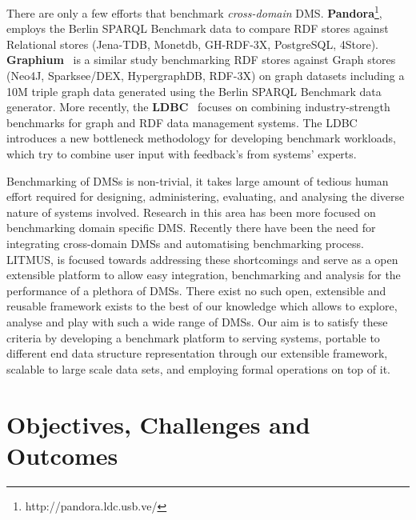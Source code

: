 \documentclass{llncs}
\begin{document}
    
    There are only a few efforts that benchmark \textit{cross-domain} DMS. \textbf{Pandora}\footnote{http://pandora.ldc.usb.ve/}, employs the Berlin SPARQL Benchmark data to compare RDF stores against Relational stores (Jena-TDB, Monetdb, GH-RDF-3X, PostgreSQL, 4Store). \textbf{Graphium}~\cite{flores2013graphium} is a similar study benchmarking RDF stores against Graph stores (Neo4J, Sparksee/DEX, HypergraphDB, RDF-3X) on graph datasets including a 10M triple graph data generated using the Berlin SPARQL Benchmark data generator. More recently, the \textbf{LDBC}~\cite{DBLP:journals/sigmod/AnglesBLF0ENMKT14} focuses on combining industry-strength benchmarks for graph and RDF data management systems.
    The LDBC introduces a new bottleneck methodology for developing benchmark workloads, which try to combine user input with feedback's from systems' experts.
    
    Benchmarking of DMSs is non-trivial, it takes large amount of tedious human effort required for designing, administering, evaluating, and analysing the diverse nature of systems involved. Research in this area has been more focused on benchmarking domain specific DMS. Recently there have been the need for integrating cross-domain DMSs and automatising benchmarking process. LITMUS, is focused towards addressing these shortcomings and serve as a open extensible platform to allow easy integration, benchmarking and analysis for the performance of a plethora of DMSs. There exist no such open, extensible and reusable framework exists to the best of our knowledge which allows to explore, analyse and play with such a wide range of DMSs.
    Our aim is to satisfy these criteria by developing a benchmark platform to serving systems, portable to different end data structure representation through our extensible framework, scalable to large scale data sets, and employing formal operations on top of it.
    

\section{Objectives, Challenges and Outcomes}\label{Objectives}
\end{document}
